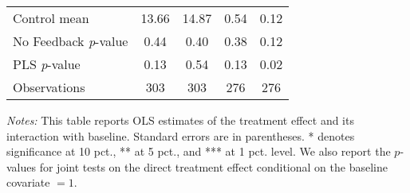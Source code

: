 \begin{table}[ht]
{\begin{threeparttable}
\begin{tabular}{l*{4}{c}}
Control mean    &    13.66         &    14.87         &     0.54         &     0.12         \\
No Feedback \emph{p}-value&     0.44         &     0.40         &     0.38         &     0.12         \\
PLS \emph{p}-value&     0.13         &     0.54         &     0.13         &     0.02         \\
Observations    &      303         &      303         &      276         &      276         \\
\bottomrule \end{tabular} \begin{tablenotes}[flushleft] \footnotesize \item \emph{Notes:} This table reports OLS estimates of the treatment effect and its interaction with baseline. Standard errors are in parentheses. * denotes significance at 10 pct., ** at 5 pct., and *** at 1 pct. level. We also report the \(p\)-values for joint tests on the direct treatment effect conditional on the baseline covariate $= 1$. \end{tablenotes} \end{threeparttable} } \end{table}

